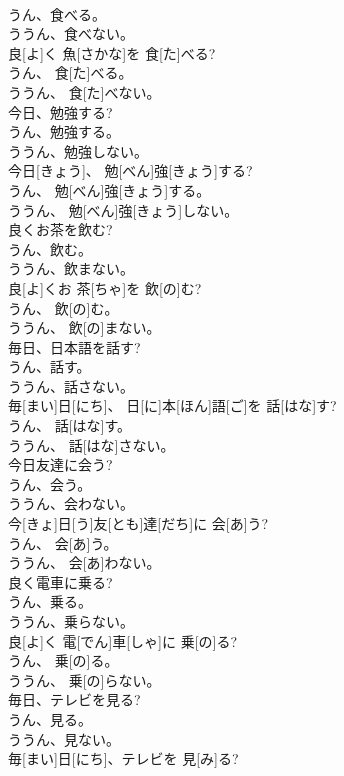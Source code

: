 \documentclass[8pt]{extreport}
\begin{document}
\begin{CJK}{UTF8}{min}
\\	うん、食べる。 
\\	ううん、食べない。	
\\	良[よ]く 魚[さかな]を 食[た]べる? 
\\	うん、 食[た]べる。 
\\	ううん、 食[た]べない。
\\	今日、勉強する? 
\\	うん、勉強する。 
\\	ううん、勉強しない。	
\\	今日[きょう]、 勉[べん]強[きょう]する? 
\\	うん、 勉[べん]強[きょう]する。 
\\	ううん、 勉[べん]強[きょう]しない。
\\	良くお茶を飲む? 
\\	うん、飲む。 
\\	ううん、飲まない。	
\\	良[よ]くお 茶[ちゃ]を 飲[の]む? 
\\	うん、 飲[の]む。 
\\	ううん、 飲[の]まない。
\\	毎日、日本語を話す? 
\\	うん、話す。 
\\	ううん、話さない。	
\\	毎[まい]日[にち]、 日[に]本[ほん]語[ご]を 話[はな]す? 
\\	うん、 話[はな]す。 
\\	ううん、 話[はな]さない。
\\	今日友達に会う? 
\\	うん、会う。 
\\	ううん、会わない。	
\\	今[きょ]日[う]友[とも]達[だち]に 会[あ]う? 
\\	うん、 会[あ]う。 
\\	ううん、 会[あ]わない。
\\	良く電車に乗る? 
\\	うん、乗る。 
\\	ううん、乗らない。	
\\	良[よ]く 電[でん]車[しゃ]に 乗[の]る? 
\\	うん、 乗[の]る。 
\\	ううん、 乗[の]らない。
\\	毎日、テレビを見る? 
\\	うん、見る。 
\\	ううん、見ない。	
\\	毎[まい]日[にち]、テレビを 見[み]る? 

\end{CJK}
\end{document}
